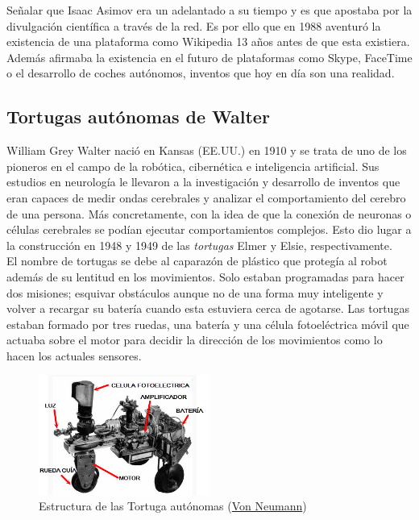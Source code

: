 Señalar que Isaac Asimov era un adelantado a su tiempo y es que apostaba por la divulgación científica a través de la red. Es por ello que en 1988 aventuró la existencia de una plataforma como Wikipedia 13 años antes de que esta existiera. Además afirmaba la existencia en el futuro de plataformas como Skype, FaceTime o el desarrollo de coches autónomos, inventos que hoy en día son una realidad.



\subsection{Tortugas autónomas de Walter}

William Grey Walter nació en Kansas (EE.UU.) en 1910 y se trata de uno de los pioneros en el campo de la robótica, cibernética e inteligencia artificial. Sus estudios en neurología le llevaron a la investigación y desarrollo de inventos que eran capaces de medir ondas cerebrales y analizar el comportamiento del cerebro de una persona. Más concretamente, con la idea de que la conexión de neuronas o células cerebrales se podían ejecutar comportamientos complejos. Esto dio lugar a la construcción en 1948 y 1949 de las \textit{tortugas} Elmer y Elsie, respectivamente.\\

El nombre de tortugas se debe al caparazón de plástico que protegía al robot además de su lentitud en los movimientos. Solo estaban programadas para hacer dos misiones; esquivar obstáculos aunque no de una forma muy inteligente y volver a recargar su batería cuando esta estuviera cerca de agotarse. Las tortugas estaban formado por tres ruedas, una batería y una célula fotoeléctrica móvil que actuaba sobre el motor para decidir la dirección de los movimientos como lo hacen los actuales sensores.

\begin{figure}[H]
\begin{center}
  \includegraphics[width=0.5\textwidth]{./EtapaPrimeriza/imagenes/t1.jpg}
  \caption{Estructura de las Tortuga autónomas (\href{https://vonneumannmachine.files.wordpress.com/2011/05/elsie.jpg} {Von Neumann})}
  \label{t1}
\end{center}
\end{figure}


